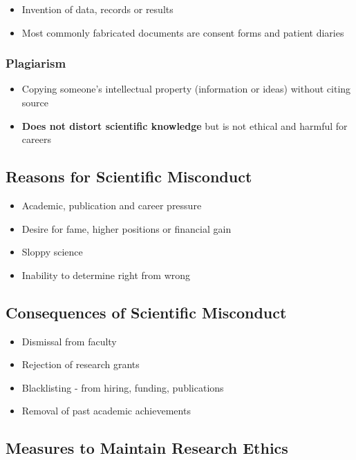 \documentclass{article}
\begin{document}
\begin{itemize}
    \item Invention of data, records or results
    \item Most commonly fabricated documents are consent forms and patient diaries
\end{itemize}

\subsubsection{Plagiarism}

\begin{itemize}
    \item Copying someone's intellectual property (information or ideas) without citing source
    \item \textbf{Does not distort scientific knowledge} but is not ethical and harmful for careers
\end{itemize}

\subsection{Reasons for Scientific Misconduct}

\begin{itemize}
    \item Academic, publication and career pressure
    \item Desire for fame, higher positions or financial gain
    \item Sloppy science
    \item Inability to determine right from wrong
\end{itemize}

\subsection{Consequences of Scientific Misconduct}

\begin{itemize}
    \item Dismissal from faculty
    \item Rejection of research grants
    \item Blacklisting - from hiring, funding, publications
    \item Removal of past academic achievements
\end{itemize}

\subsection{Measures to Maintain Research Ethics}
\end{document}
